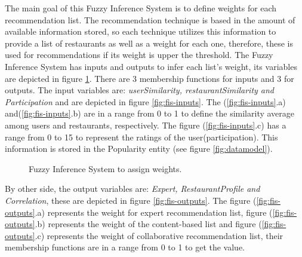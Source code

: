 The main goal of this Fuzzy Inference System is to define weights for each recommendation list. The recommendation technique is based in the amount of available information stored, so each technique utilizes this information to provide a list of restaurants as well as a weight for each one, therefore, these is used for  recommendations if its weight is upper the threshold.  The Fuzzy Inference System has inputs and outputs to infer each list's weight, its variables are depicted in figure \ref{fig:fis-pesos}. 
There are 3 membership functions for inputs and 3 for outputs. The input variables are: \textit{userSimilarity, restaurantSimilarity and Participation} and are depicted in figure \ref{fig:fis-inputs}. The (\ref{fig:fis-inputs}.a) and(\ref{fig:fis-inputs}.b) are in a range from 0 to 1 to define the similarity average among users and restaurants, respectively. The figure (\ref{fig:fis-inputs}.c) has a range from 0 to 15  to represent the ratings of the user(participation). This information is stored in the Popularity entity (see figure \ref{fig:datamodel}). \\
\begin{figure}
\captionsetup{justification=centering,margin=2cm}
\centering
{}
\caption{Fuzzy Inference System to assign weights.}
\label{fig:fis-pesos}       %
\end{figure}
By other side, the output variables are: \textit{Expert, RestaurantProfile and Correlation}, these are depicted in figure \ref{fig:fis-outputs}. The figure (\ref{fig:fis-outputs}.a) represents the weight for expert recommendation list, figure (\ref{fig:fis-outputs}.b) represents the weight of the content-based list and figure (\ref{fig:fis-outputs}.c) represents the weight of collaborative recommendation list, their membership functions are in a range from 0 to 1 to get the value.

